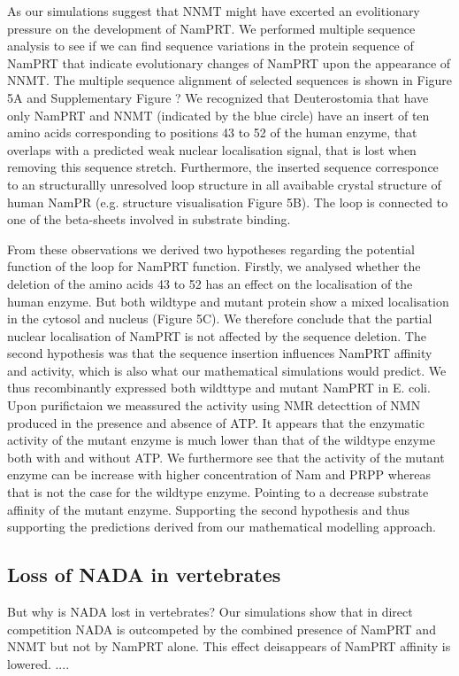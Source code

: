 As our simulations suggest that NNMT might have excerted an evolitionary pressure on the development of NamPRT. We performed multiple sequence analysis to see if we can find sequence variations in the protein sequence of NamPRT that indicate evolutionary changes of NamPRT upon the appearance of NNMT. The multiple sequence alignment of selected sequences is shown in Figure 5A and Supplementary Figure ? We recognized that Deuterostomia that have only NamPRT and NNMT (indicated by the blue circle) have an insert of ten amino acids corresponding to positions 43 to 52 of the human enzyme, that overlaps with a predicted weak nuclear localisation signal, that is lost when removing this sequence stretch.
Furthermore, the inserted sequence corresponce to an structurallly unresolved loop structure in all avaibable crystal structure of human NamPR (e.g. \cite{Wang2006} structure visualisation Figure 5B). The loop is connected to one of the beta-sheets involved in substrate binding.

From these observations we derived two hypotheses regarding the potential function of the loop for NamPRT function. Firstly, we analysed whether the deletion of the amino acids 43 to 52 has an effect on the localisation of the human enzyme. But both wildtype and mutant protein show a mixed localisation in the cytosol and nucleus (Figure 5C). We therefore conclude that the partial nuclear localisation of NamPRT is not affected by the sequence deletion.
The second hypothesis was that the sequence insertion influences NamPRT affinity and activity, which is also what our mathematical simulations would predict. We thus recombinantly expressed  both wildttype and mutant  NamPRT  in E. coli.  Upon purifictaion we meassured the activity using NMR detecttion of NMN produced in the presence and absence of ATP. It appears that the enzymatic activity of the mutant enzyme is much lower than that of the wildtype enzyme both with and without ATP. We furthermore see that the activity of the mutant enzyme can be increase with higher concentration of Nam and PRPP whereas that is not the case for the wildtype enzyme. Pointing to a decrease substrate affinity of the mutant enzyme. Supporting the second hypothesis and thus supporting the predictions derived from our mathematical modelling approach.

\subsection{Loss of NADA in vertebrates}

But why is NADA lost in vertebrates? Our simulations show that in direct competition NADA is outcompeted by the combined presence of NamPRT and NNMT but not by NamPRT alone. This effect deisappears of NamPRT affinity is lowered. ....

